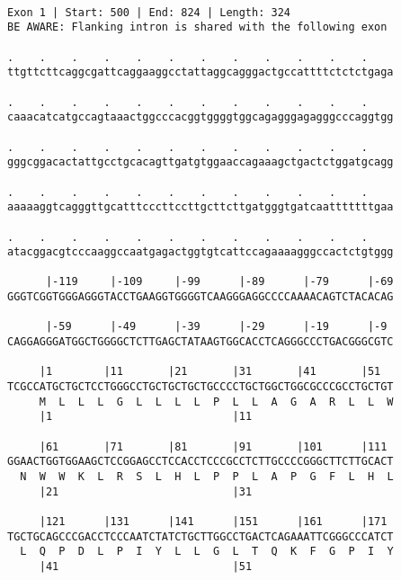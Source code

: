 \documentclass{article}
\begin{document}
 \begin{Verbatim}
 
Exon 1 | Start: 500 | End: 824 | Length: 324
BE AWARE: Flanking intron is shared with the following exon
 
.    .    .    .    .    .    .    .    .    .    .    .    
ttgttcttcaggcgattcaggaaggcctattaggcagggactgccattttctctctgaga
                                                            
.    .    .    .    .    .    .    .    .    .    .    .    
caaacatcatgccagtaaactggcccacggtggggtggcagagggagagggcccaggtgg
                                                            
.    .    .    .    .    .    .    .    .    .    .    .    
gggcggacactattgcctgcacagttgatgtggaaccagaaagctgactctggatgcagg
                                                            
.    .    .    .    .    .    .    .    .    .    .    .    
aaaaaggtcagggttgcatttcccttccttgcttcttgatgggtgatcaatttttttgaa
                                                            
.    .    .    .    .    .    .    .    .    .    .    .    
atacggacgtcccaaggccaatgagactggtgtcattccagaaaagggccactctgtggg
                                                            
      |-119     |-109     |-99      |-89      |-79      |-69
GGGTCGGTGGGAGGGTACCTGAAGGTGGGGTCAAGGGAGGCCCCAAAACAGTCTACACAG
                                                            
      |-59      |-49      |-39      |-29      |-19      |-9 
CAGGAGGGATGGCTGGGGCTCTTGAGCTATAAGTGGCACCTCAGGGCCCTGACGGGCGTC
                                                            
     |1        |11       |21       |31       |41       |51  
TCGCCATGCTGCTCCTGGGCCTGCTGCTGCTGCCCCTGCTGGCTGGCGCCCGCCTGCTGT
     M  L  L  L  G  L  L  L  L  P  L  L  A  G  A  R  L  L  W
     |1                            |11                      
  
     |61       |71       |81       |91       |101      |111 
GGAACTGGTGGAAGCTCCGGAGCCTCCACCTCCCGCCTCTTGCCCCGGGCTTCTTGCACT
  N  W  W  K  L  R  S  L  H  L  P  P  L  A  P  G  F  L  H  L
     |21                           |31                      
  
     |121      |131      |141      |151      |161      |171 
TGCTGCAGCCCGACCTCCCAATCTATCTGCTTGGCCTGACTCAGAAATTCGGGCCCATCT
  L  Q  P  D  L  P  I  Y  L  L  G  L  T  Q  K  F  G  P  I  Y
     |41                           |51                      
  

\end{Verbatim}
\end{document}
